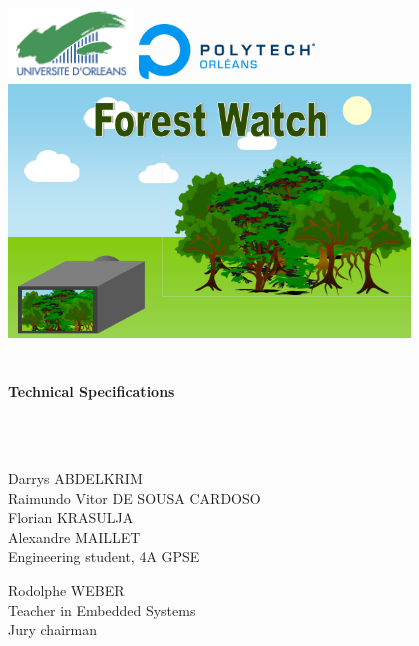 \begin{titlepage}
\begin{center}

\includegraphics[width=0.25\textwidth]{./titre/universite.jpg}
\hfill
\hfill
\includegraphics[width=0.35\textwidth]{./titre/polytech.jpg}~\\[2.5cm]


\includegraphics[width=0.8\textwidth]{./titre/logo.png}~\\[1cm]

\textsc{\Large }\\[0.1cm]

\HRule\\[0.2cm]
{\huge\bfseries Technical Specifications\\
[0.4cm] }

\HRule\\[0.8cm]

\vfill
\begin{minipage}{0.4\textwidth}
    \begin{flushleft} \large
        \emph{}\\
        Darrys \textsc{ABDELKRIM}\\
        Raimundo Vitor \textsc{DE SOUSA CARDOSO}\\
        Florian \textsc{KRASULJA}\\
        Alexandre \textsc{MAILLET}\\
        Engineering student, \textsc{4A GPSE}
    \end{flushleft}
\end{minipage}
\begin{minipage}{0.4\textwidth}
    \begin{flushright} \large
        Rodolphe \textsc{WEBER}\\
        Teacher in Embedded Systems\\
        Jury chairman
    \end{flushright}
\end{minipage}


\end{center}
\end{titlepage}
